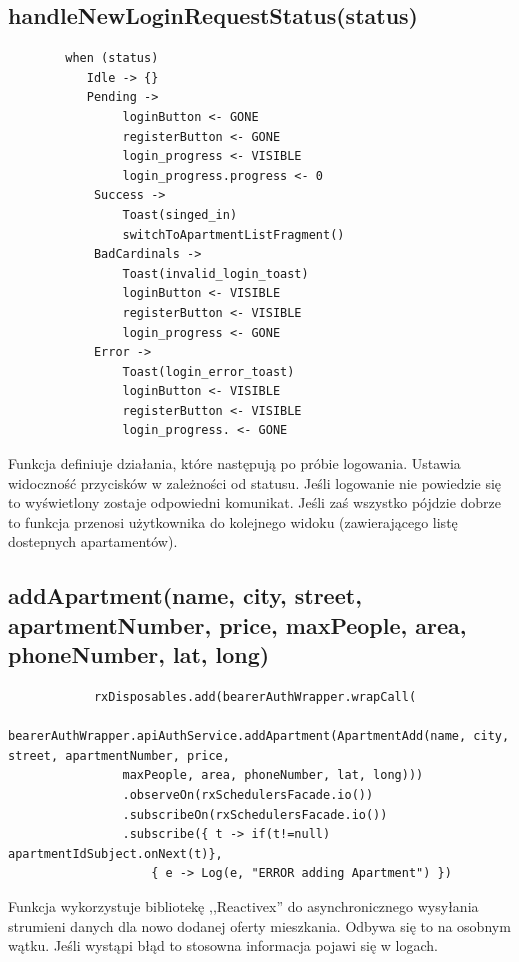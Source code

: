 \documentclass[polish, 11pt]{article}
\begin{document}
    \subsection{handleNewLoginRequestStatus(status)}
        \begin{lstlisting}
        when (status) 
           Idle -> {}
           Pending -> 
                loginButton <- GONE
                registerButton <- GONE
                login_progress <- VISIBLE
                login_progress.progress <- 0
            Success -> 
                Toast(singed_in)
                switchToApartmentListFragment()
            BadCardinals -> 
                Toast(invalid_login_toast)
                loginButton <- VISIBLE
                registerButton <- VISIBLE
                login_progress <- GONE
            Error -> 
                Toast(login_error_toast)
                loginButton <- VISIBLE
                registerButton <- VISIBLE
                login_progress. <- GONE
         \end{lstlisting}
         Funkcja definiuje działania, które następują po próbie logowania. Ustawia widoczność przycisków w zależności od statusu. Jeśli logowanie nie powiedzie się to wyświetlony zostaje odpowiedni komunikat. Jeśli zaś wszystko pójdzie dobrze to funkcja przenosi użytkownika do kolejnego widoku (zawierającego listę dostepnych apartamentów).
    \subsection{addApartment(name, city, street, apartmentNumber, price, maxPeople, area, phoneNumber, lat, long)}
        \begin{lstlisting}
            rxDisposables.add(bearerAuthWrapper.wrapCall(
            bearerAuthWrapper.apiAuthService.addApartment(ApartmentAdd(name, city, street, apartmentNumber, price,
                maxPeople, area, phoneNumber, lat, long)))
                .observeOn(rxSchedulersFacade.io())
                .subscribeOn(rxSchedulersFacade.io())
                .subscribe({ t -> if(t!=null) apartmentIdSubject.onNext(t)},
                    { e -> Log(e, "ERROR adding Apartment") })
        \end{lstlisting}
        Funkcja wykorzystuje bibliotekę ,,Reactivex'' do asynchronicznego wysyłania strumieni danych dla nowo dodanej oferty mieszkania. Odbywa się to na osobnym wątku. Jeśli wystąpi błąd to stosowna informacja pojawi się w logach.
\end{document}
